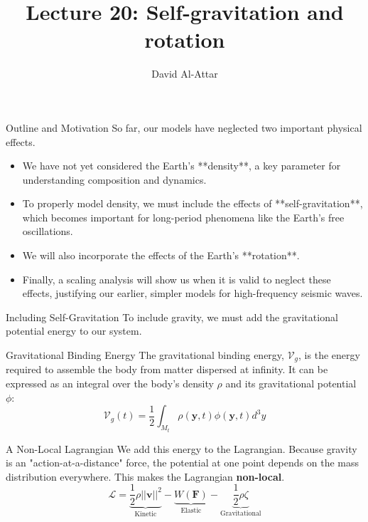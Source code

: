 \documentclass{beamer}
\title[Lecture 20: Self-gravitation and rotation]{Lecture 20: Self-gravitation and rotation}
\author{David Al-Attar}
\institute{Michaelmas term 2024}
\date{}
\begin{document}

\begin{frame}
    \titlepage
\end{frame}

\begin{frame}{Outline and Motivation}
    So far, our models have neglected two important physical effects.
    \begin{itemize}
        \item We have not yet considered the Earth's **density**, a key parameter for understanding composition and dynamics.
        \pause
        \item To properly model density, we must include the effects of **self-gravitation**, which becomes important for long-period phenomena like the Earth's free oscillations.
        \pause
        \item We will also incorporate the effects of the Earth's **rotation**.
        \pause
        \item Finally, a scaling analysis will show us when it is valid to neglect these effects, justifying our earlier, simpler models for high-frequency seismic waves.
    \end{itemize}
\end{frame}


\begin{frame}{Including Self-Gravitation}
    To include gravity, we must add the gravitational potential energy to our system.
    \begin{block}{Gravitational Binding Energy}
        The gravitational binding energy, $ \mathcal{V}_g $, is the energy required to assemble the body from matter dispersed at infinity. It can be expressed as an integral over the body's density $ \rho $ and its gravitational potential $ \phi $:
        $$ \mathcal{V}_{g}(t)=\frac{1}{2}\int_{M_{t}}\rho(\mathbf{y},t)\phi(\mathbf{y},t)d^{3}y $$
    \end{block}
    \pause
    \begin{alertblock}{A Non-Local Lagrangian}
        We add this energy to the Lagrangian. Because gravity is an "action-at-a-distance" force, the potential at one point depends on the mass distribution everywhere. This makes the Lagrangian \textbf{non-local}.
        $$ \mathcal{L} = \underbrace{\frac{1}{2}\rho||\mathbf{v}||^{2}}_{\text{Kinetic}} - \underbrace{W(\mathbf{F})}_{\text{Elastic}} - \underbrace{\frac{1}{2}\rho\zeta}_{\text{Gravitational}} $$
    \end{alertblock}
\end{frame}
\end{document}
